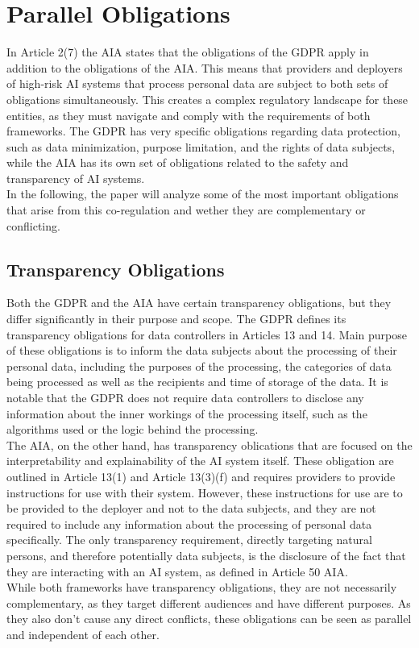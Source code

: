 \documentclass[
	a4paper, %
	10pt, %
	unnumberedsections, %
	twoside, %
]{LTJournalArticle}
\begin{document}
\section{Parallel Obligations}
In Article 2(7) the AIA states that the obligations of the GDPR apply in addition to the obligations of the AIA. This means that providers and deployers of high-risk AI systems that process personal data are subject to both sets of obligations simultaneously.
This creates a complex regulatory landscape for these entities, as they must navigate and comply with the requirements of both frameworks. The GDPR has very specific obligations regarding data protection, such as data minimization, purpose limitation, and the rights of data subjects, while the AIA has its own set of obligations related to the safety and transparency of AI systems.\\
In the following, the paper will analyze some of the most important obligations that arise from this co-regulation and wether they are complementary or conflicting.

\subsection{Transparency Obligations}
Both the GDPR and the AIA have certain transparency obligations, but they differ significantly in their purpose and scope. The GDPR defines its transparency obligations for data controllers in Articles 13 and 14.
Main purpose of these obligations is to inform the data subjects about the processing of their personal data, including the purposes of the processing, the categories of data being processed as well as the recipients and time of storage of the data.
It is notable that the GDPR does not require data controllers to disclose any information about the inner workings of the processing itself, such as the algorithms used or the logic behind the processing.~\cite{eugdpr2016}\\
The AIA, on the other hand, has transparency oblications that are focused on the interpretability and explainability of the AI system itself. These obligation are outlined in Article 13(1) and Article 13(3)(f) and requires providers to provide instructions for use with their system. 
However, these instructions for use are to be provided to the deployer and not to the data subjects, and they are not required to include any information about the processing of personal data specifically. 
The only transparency requirement, directly targeting natural persons, and therefore potentially data subjects, is the disclosure of the fact that they are interacting with an AI system, as defined in Article 50 AIA.~\cite{euaiact2024}\\
While both frameworks have transparency obligations, they are not necessarily complementary, as they target different audiences and have different purposes. As they also don't cause any direct conflicts, these obligations can be seen as parallel and independent of each other.
\end{document}

